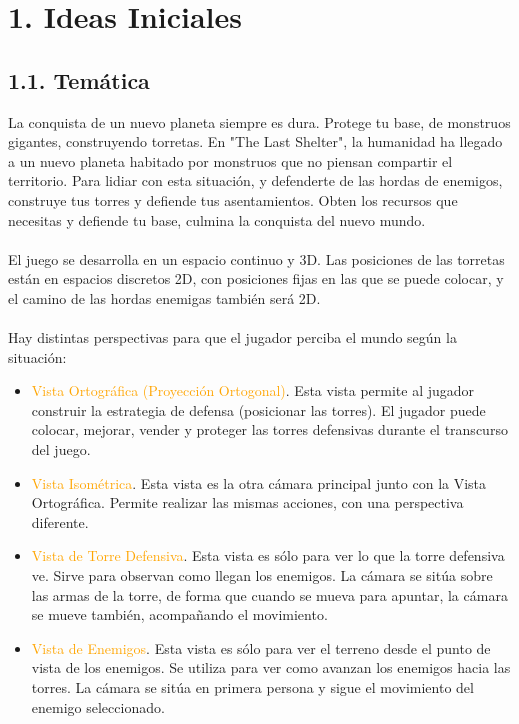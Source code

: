 \documentclass{article}
\begin{document}


\setcounter{page}{2}

\tableofcontents

\clearpage



\section{1. Ideas Iniciales}

\subsection{1.1. Temática}

\noindent La conquista de un nuevo planeta siempre es dura. Protege tu base, de monstruos gigantes, construyendo torretas. En "The Last Shelter", la humanidad ha llegado a un nuevo planeta habitado por monstruos que no piensan compartir el territorio. Para lidiar con esta situación, y defenderte de las hordas de enemigos, construye tus torres y defiende tus asentamientos. Obten los recursos que necesitas y defiende tu base, culmina la conquista del nuevo mundo.
\\\\
El juego se desarrolla en un espacio continuo y 3D. Las posiciones de las torretas están en espacios discretos 2D, con posiciones fijas en las que se puede colocar, y el camino de las hordas enemigas también será 2D.
\\\\
Hay distintas perspectivas para que el jugador perciba el mundo según la situación:

\begin{itemize}
    \item \textcolor{Orange}{Vista Ortográfica (Proyección Ortogonal)}. Esta vista permite al jugador construir la estrategia de defensa (posicionar las torres). El jugador puede colocar, mejorar, vender y proteger las torres defensivas durante el transcurso del juego.
    \item \textcolor{Orange}{Vista Isométrica}. Esta vista es la otra cámara principal junto con la Vista Ortográfica. Permite realizar las mismas acciones, con una perspectiva diferente.
    \item \textcolor{Orange}{Vista de Torre Defensiva}. Esta vista es sólo para ver lo que la torre defensiva ve. Sirve para observan como llegan los enemigos. La cámara se sitúa sobre las armas de la torre, de forma que cuando se mueva para apuntar, la cámara se mueve también, acompañando el movimiento.
    \item \textcolor{Orange}{Vista de Enemigos}. Esta vista es sólo para ver el terreno desde el punto de vista de los enemigos. Se utiliza para ver como avanzan los enemigos hacia las torres. La cámara se sitúa en primera persona y sigue el movimiento del enemigo seleccionado. 
\end{itemize}
\end{document}
